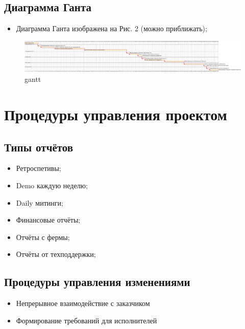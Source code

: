 \documentclass[a4paper,8pt]{article}
\begin{document}
\subsection{Диаграмма Ганта}

    \begin{itemize}
        \item Диаграмма Ганта изображена на Рис. 2 (можно приближать);
    \end{itemize}


    \begin{figure}[h]
        \centering
        \includegraphics[width=1\textwidth]{./pics/gantt.pdf}
        \caption{gantt}
    \end{figure}




\section{Процедуры управления проектом}



\subsection{Типы отчётов}

    \begin{itemize}
        \item Ретроспетивы;
        \item Demo каждую неделю;
        \item Daily митинги;
        \item Финансовые отчёты;
        \item Отчёты с фермы;
        \item Отчёты от техподдержки;
    \end{itemize}


\subsection{Процедуры управления изменениями}

    \begin{itemize}
        \item Непрерывное взаимодействие с заказчиком
        \item Формирование требований для исполнителей
    \end{itemize}
\end{document}
